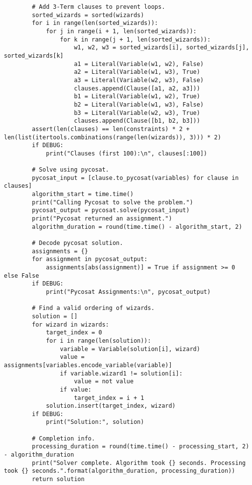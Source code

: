 \documentclass{article}
\theoremstyle{plain}
\numberwithin{theorem}{subsection}
\theoremstyle{definition}
\numberwithin{equation}{subsection}
\begin{document}
\begin{lstlisting}
        # Add 3-Term clauses to prevent loops.
        sorted_wizards = sorted(wizards)
        for i in range(len(sorted_wizards)):
            for j in range(i + 1, len(sorted_wizards)):
                for k in range(j + 1, len(sorted_wizards)):
                    w1, w2, w3 = sorted_wizards[i], sorted_wizards[j], sorted_wizards[k]
                    a1 = Literal(Variable(w1, w2), False)
                    a2 = Literal(Variable(w1, w3), True)
                    a3 = Literal(Variable(w2, w3), False)
                    clauses.append(Clause([a1, a2, a3]))
                    b1 = Literal(Variable(w1, w2), True)
                    b2 = Literal(Variable(w1, w3), False)
                    b3 = Literal(Variable(w2, w3), True)
                    clauses.append(Clause([b1, b2, b3]))
        assert(len(clauses) == len(constraints) * 2 + len(list(itertools.combinations(range(len(wizards)), 3))) * 2)
        if DEBUG:
            print("Clauses (first 100):\n", clauses[:100])
    
        # Solve using pycosat.
        pycosat_input = [clause.to_pycosat(variables) for clause in clauses]
        algorithm_start = time.time()
        print("Calling Pycosat to solve the problem.")
        pycosat_output = pycosat.solve(pycosat_input)
        print("Pycosat returned an assignment.")
        algorithm_duration = round(time.time() - algorithm_start, 2)
    
        # Decode pycosat solution.
        assignments = {}
        for assignment in pycosat_output:
            assignments[abs(assignment)] = True if assignment >= 0 else False
        if DEBUG:
            print("Pycosat Assignments:\n", pycosat_output)
    
        # Find a valid ordering of wizards.
        solution = []
        for wizard in wizards:
            target_index = 0
            for i in range(len(solution)):
                variable = Variable(solution[i], wizard)
                value = assignments[variables.encode_variable(variable)]
                if variable.wizard1 != solution[i]:
                    value = not value
                if value:
                    target_index = i + 1
            solution.insert(target_index, wizard)
        if DEBUG:
            print("Solution:", solution)
        
        # Completion info.
        processing_duration = round(time.time() - processing_start, 2) - algorithm_duration
        print("Solver complete. Algorithm took {} seconds. Processing took {} seconds.".format(algorithm_duration, processing_duration))
        return solution
    

\end{lstlisting}
\end{document}
